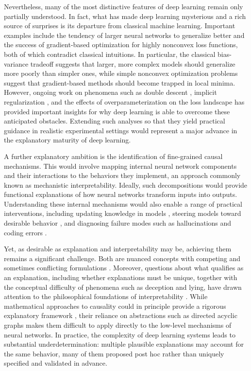 \documentclass{article}
\begin{document}
Nevertheless, many of the most distinctive features of deep learning remain only partially understood.
In fact, what has made deep learning mysterious and a rich source of surprises is its departure from classical machine learning.
Important examples include the tendency of larger neural networks to generalize better and the success of gradient-based optimization for highly nonconvex loss functions, both of which contradict classical intuitions.
In particular, the classical bias-variance tradeoff suggests that larger, more complex models should generalize more poorly than simpler ones, while simple nonconvex optimization problems suggest that gradient-based methods should become trapped in local minima.
However, ongoing work on phenomena such as double descent \cite{belkin2019reconciling_double_descent}, implicit regularization \cite{soudry2017implicit}, and the effects of overparameterization on the loss landscape \cite{ge2017no, du2018gradient} has provided important insights for why deep learning is able to overcome these anticipated obstacles.
Extending such analyses so that they yield practical guidance in realistic experimental settings would represent a major advance in the explanatory maturity of deep learning.

A further explanatory ambition is the identification of fine-grained causal mechanisms.
This would involve mapping internal neural network components and their interactions to the behaviors they implement, an approach commonly known as mechanistic interpretability.
Ideally, such decompositions would provide functional explanations of how neural networks transform inputs into outputs.
Understanding these internal mechanisms would also enable a range of practical interventions, including updating knowledge in models \cite{wang2024knowledgeediting}, steering models toward desirable behavior \cite{zou2024improving}, and diagnosing failure modes such as hallucinations \cite{xiong2025faithfulretrievalaugmentedgenerationsparse} and coding errors \cite{bui2025correctness}.

Yet, as desirable as explanation and interpretability may be, achieving them remains a significant challenge.
Both are nuanced concepts with competing and sometimes conflicting formulations \cite{LiptonMythos, JainWallace2019Attention, wiegreffe-pinter-2019-attention}.
Moreover, questions about what qualifies as an explanation, including whether explanations must be unique, together with the conceptual difficulty of phenomena such as deception and lying, have drawn attention to the philosophical foundations of interpretability \cite{meloux2025everything, Williams2025MechanisticInterpretabilityNeedsPhilosophy}.
While mathematical approaches to causality could in principle provide a rigorous explanatory framework \cite{pearl2009causality}, their reliance on abstractions such as directed acyclic graphs makes them difficult to apply directly to the low-level mechanisms of neural networks.
In practice, the complexity of deep learning systems leads to substantial underdetermination: multiple plausible explanations may account for the same behavior, many of them proposed post hoc rather than uniquely specified and validated in advance.
\end{document}
